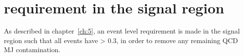 \chapter{\mindphistar requirement in the signal region}
\label{ch:app_dphistar}

As described in chapter~\ref{ch:5}, an event level requirement is made in the
signal region such that all events have \mindphistar > 0.3, in order to remove
any remaining QCD MJ contamination. 




